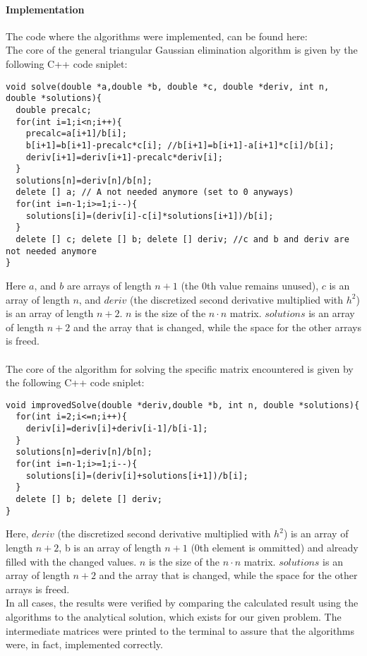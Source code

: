 \documentclass[10pt,a4paper]{article}
\begin{document}
\paragraph{Implementation}
The code where the algorithms were implemented, can be found here: \\
The core of the general triangular Gaussian elimination algorithm is given by the following C++ code sniplet:
\begin{lstlisting}[caption=Code for solving the general triangular matrix]
void solve(double *a,double *b, double *c, double *deriv, int n, double *solutions){
  double precalc;
  for(int i=1;i<n;i++){
    precalc=a[i+1]/b[i];
    b[i+1]=b[i+1]-precalc*c[i]; //b[i+1]=b[i+1]-a[i+1]*c[i]/b[i];
    deriv[i+1]=deriv[i+1]-precalc*deriv[i];
  }
  solutions[n]=deriv[n]/b[n];
  delete [] a; // A not needed anymore (set to 0 anyways)
  for(int i=n-1;i>=1;i--){
    solutions[i]=(deriv[i]-c[i]*solutions[i+1])/b[i];
  }
  delete [] c; delete [] b; delete [] deriv; //c and b and deriv are not needed anymore
}
\end{lstlisting}
Here $a$, and $b$ are arrays of length $n+1$ (the 0th value remains unused), $c$ is an array of length $n$, and $deriv$ (the discretized second derivative multiplied with $h^2$) is an array of length $n+2$. $n$ is the size of the $ n\cdot n$ matrix. $solutions$ is an array of length $n+2$ and the array that is changed, while the space for the other arrays is freed.\\\\
The core of the algorithm for solving the specific matrix encountered is given by the following C++ code sniplet:
\begin{lstlisting}[caption=Code for solving the specific triangular matrix]
void improvedSolve(double *deriv,double *b, int n, double *solutions){
  for(int i=2;i<=n;i++){
    deriv[i]=deriv[i]+deriv[i-1]/b[i-1];
  }
  solutions[n]=deriv[n]/b[n];
  for(int i=n-1;i>=1;i--){
    solutions[i]=(deriv[i]+solutions[i+1])/b[i];
  }
  delete [] b; delete [] deriv;
}
\end{lstlisting}
Here, $deriv$ (the discretized second derivative multiplied with $h^2$) is an array of length $n+2$, b is an array of length $n+1$ (0th element is ommitted) and already filled with the changed values.  $n$ is the size of the $n\cdot n$ matrix. $solutions$ is an array of length $n+2$ and the array that is changed, while the space for the other arrays is freed.\\
In all cases, the results were verified by comparing the calculated result using the algorithms to the analytical solution, which exists for our given problem. The intermediate matrices were printed to the terminal to assure that the algorithms were, in fact, implemented correctly. 
\end{document}
